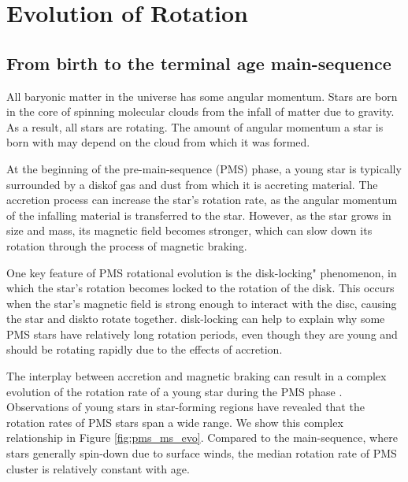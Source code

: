 \section{Evolution of Rotation}
\label{sec:evolution}

\subsection{From birth to the terminal age main-sequence}

All baryonic matter in the universe has some angular momentum. 
Stars are born in the core of spinning molecular clouds from the infall of matter due to gravity. 
As a result, all stars are rotating.
The amount of angular momentum a star is born with may depend on the cloud from which it was formed.

At the beginning of the pre-main-sequence (PMS) phase, a young star is typically surrounded by a diskof gas and dust from which it is accreting material.
The accretion process can increase the star's rotation rate, as the angular momentum of the infalling material is transferred to the star.
However, as the star grows in size and mass, its magnetic field becomes stronger, which can slow down its rotation through the process of magnetic braking.

One key feature of PMS rotational evolution is the disk-locking" phenomenon, in which the star's rotation becomes locked to the rotation of the disk\citep{eggenberger_angular_2012}.
This occurs when the star's magnetic field is strong enough to interact with the disc, causing the star and diskto rotate together.
disk-locking can help to explain why some PMS stars have relatively long rotation periods, even though they are young and should be rotating rapidly due to the effects of accretion.

The interplay between accretion and magnetic braking can result in a complex evolution of the rotation rate of a young star during the PMS phase \citep{gallet_improved_2013}.
Observations of young stars in star-forming regions have revealed that the rotation rates of PMS stars span a wide range.
We show this complex relationship in Figure \ref{fig:pms_ms_evo}.
Compared to the main-sequence, where stars generally spin-down due to surface winds, the median rotation rate of PMS cluster is relatively constant with age.

